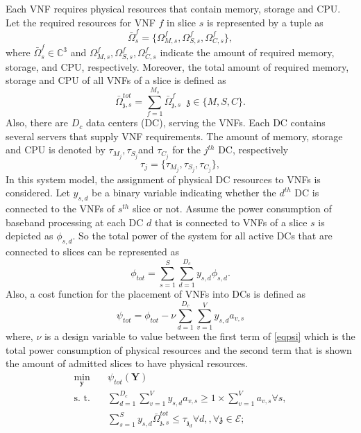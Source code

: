 \documentclass[conference]{IEEEtran}
\begin{document}
\begin{enumerate}
Each VNF requires
physical resources that contain memory, storage and CPU.
Let the required resources for VNF $f$ in slice $s$ is represented by a tuple as
\begin{equation}
\bar{\Omega}_{s}^f = \{\Omega_{M,{s}}^f, \Omega_{S,{s}}^f, \Omega_{C,{s}}^f \},
\end{equation}
where $\bar{\Omega}_{s}^f\in \mathbb{C}^{3}$ and $\Omega_{M,{s}}^f, \Omega_{S,{s}}^f, \Omega_{C,{s}}^f$ indicate the amount of required memory, storage, and CPU, respectively.
Moreover, the total amount of required memory, storage and CPU of all VNFs of a slice is defined as
\begin{equation}
\textstyle \bar{\Omega}_{\mathfrak{z},s}^{tot} = \sum_{f=1}^{M_s}\bar{\Omega}_{\mathfrak{z},s}^f \;\; \mathfrak{z} \in \{M, S, C\}.
\end{equation}
Also, there are $D_c$ data centers (DC), serving the VNFs. Each DC contains several servers that supply VNF requirements.
The amount of memory, storage and CPU is denoted by $\tau_{M_{j}}, \tau_{S_{j}}$and $\tau_{C_{j}} $ for the $j^{th}$ DC, respectively
\begin{equation*}
\tau_j = \{\tau_{M_{j}}, \tau_{S_{j}}, \tau_{C_{j}} \},
\end{equation*}
In this system model, the assignment of physical DC resources to VNFs is considered. Let $y_{s,d}$ be a binary variable indicating whether the $d^{th}$ DC is connected to the VNFs of $s^{th}$ slice or not.
Assume the power consumption of baseband processing at each DC $d$ that is connected to VNFs of a slice $s$ is depicted as
$\phi_{s,d}$. So the total power of the system for all active DCs that are connected to slices can be represented as
\begin{equation*}
\textstyle \phi_{tot} = \sum_{s=1}^{S}\sum_{d=1}^{D_c}y_{s,d}\phi_{s,d}.
\end{equation*}
Also, a cost function for the placement of VNFs into DCs is defined as
\begin{equation}\label{eqpsi}
\textstyle  \psi_{tot} = \phi_{tot} - \nu \sum_{d=1}^{D_c}\sum_{v=1}^{V}y_{s,d}a_{v,s}
\end{equation}
where, $\nu$ is a design variable to value between the first term of \eqref{eqpsi} which is the total power consumption of physical resources and the second term that is shown the amount of admitted slices to have physical resources.
\begin{subequations}
\begin{alignat}{4}
\min\limits_{\boldsymbol{y} }   \quad &   \psi_{tot}(\boldsymbol{Y})\\
\text{s. t.} \quad & \textstyle \sum_{d=1}^{D_c}\sum_{v=1}^{V}y_{s,d}a_{v,s} \geq 1\times\sum_{v=1}^{V}a_{v,s} \forall s, \\
 &\textstyle  \sum_{s=1}^{S} y_{s,d} \bar{\Omega}_{\mathfrak{z},s}^{tot}  \leq   \tau_{\mathfrak{z}_d}  \forall d,, \forall \mathfrak{z}\in \mathcal{E};  \label{eqomega}
\end{alignat}
\end{subequations}
\end{enumerate}



\end{document}

